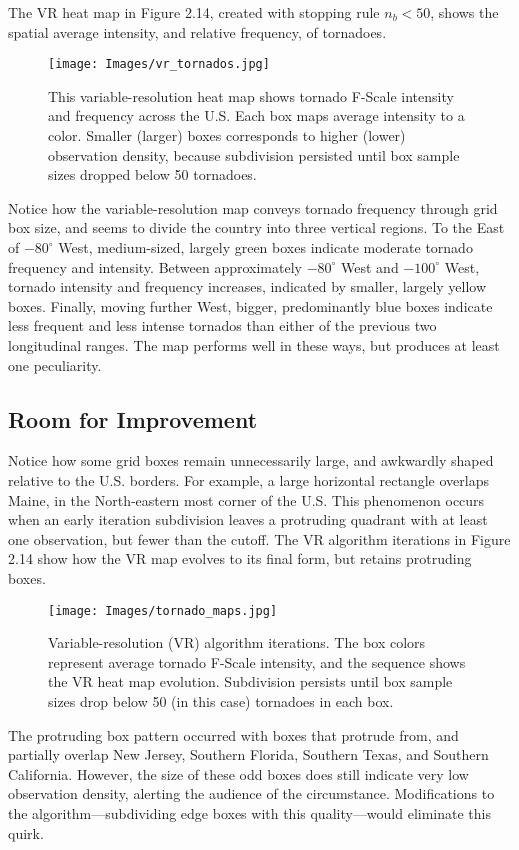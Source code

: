 The VR heat map in Figure 2.14, created with stopping rule $n_{b} < 50$, shows the spatial average intensity, and relative frequency, of tornadoes.
        \begin{figure}[H]
      	\centering      
      	\texttt{[image: Images/vr\_tornados.jpg]}
      	\caption{This variable-resolution heat map shows tornado F-Scale intensity and frequency across the U.S. Each box maps average intensity to a color. Smaller (larger) boxes corresponds to higher (lower) observation density, because subdivision persisted until box sample sizes dropped below 50 tornadoes.}
        \end{figure}
Notice how the variable-resolution map conveys tornado frequency through grid box size, and seems to divide the country into three vertical regions. To the East of $-80^{\circ}$ West, medium-sized, largely green boxes indicate moderate tornado frequency and intensity. Between approximately $-80^{\circ}$ West and $-100^{\circ}$ West, tornado intensity and frequency increases, indicated by smaller, largely yellow boxes. Finally, moving further West, bigger, predominantly blue boxes indicate less frequent and less intense tornados than either of the previous two longitudinal ranges. The map performs well in these ways, but produces at least one peculiarity.

\subsection{Room for Improvement}

Notice how some grid boxes remain unnecessarily large, and awkwardly shaped relative to the U.S. borders. For example, a large horizontal rectangle overlaps Maine, in the North-eastern most corner of the U.S. This phenomenon occurs when an early iteration subdivision leaves a protruding quadrant with at least one observation, but fewer than the cutoff. The VR algorithm iterations in Figure 2.14 show how the VR map evolves to its final form, but retains protruding boxes.
        \begin{figure}[H]
      	\centering      
      	\texttt{[image: Images/tornado\_maps.jpg]}
      	\caption{Variable-resolution (VR) algorithm iterations. The box colors represent average tornado F-Scale intensity, and the sequence shows the VR heat map evolution. Subdivision persists until box sample sizes drop below 50 (in this case) tornadoes in each box.}
        \end{figure}
The protruding box pattern occurred with boxes that protrude from, and partially overlap New Jersey, Southern Florida, Southern Texas, and Southern California. However, the size of these odd boxes does still indicate very low observation density, alerting the audience of the circumstance. Modifications to the algorithm---subdividing edge boxes with this quality---would eliminate this quirk.